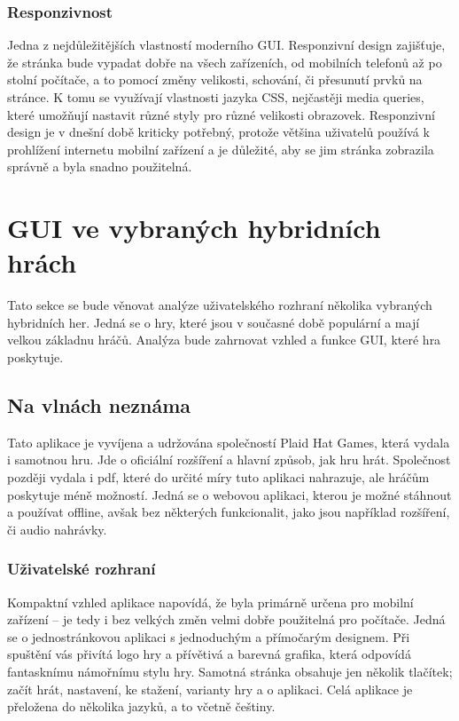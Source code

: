 \subsubsection*{Responzivnost}
Jedna z nejdůležitějších vlastností moderního GUI. Responzivní design zajišťuje, že stránka bude vypadat dobře na všech zařízeních, od mobilních telefonů až po stolní počítače, a to pomocí změny velikosti, schování, či přesunutí prvků na stránce. K tomu se využívají vlastnosti jazyka CSS, nejčastěji media queries, které umožňují nastavit různé styly pro různé velikosti obrazovek. Responzivní design je v dnešní době kriticky potřebný, protože většina uživatelů používá k prohlížení internetu mobilní zařízení a je důležité, aby se jim stránka zobrazila správně a byla snadno použitelná.\cite{responsive_design}

\section{GUI ve vybraných hybridních hrách}
Tato sekce se bude věnovat analýze uživatelského rozhraní několika vybraných hybridních her. Jedná se o hry, které jsou v současné době populární a mají velkou základnu hráčů. Analýza bude zahrnovat vzhled a funkce GUI, které hra poskytuje.

\subsection{Na vlnách neznáma}
Tato aplikace je vyvíjena a udržována společností Plaid Hat Games, která vydala i samotnou hru. Jde o oficiální rozšíření a hlavní způsob, jak hru hrát. Společnost později vydala i pdf, které do určité míry tuto aplikaci nahrazuje, ale hráčům poskytuje méně možností. Jedná se o webovou aplikaci, kterou je možné stáhnout a používat offline, avšak bez některých funkcionalit, jako jsou například rozšíření, či audio nahrávky.

\subsubsection*{Uživatelské rozhraní}
Kompaktní vzhled aplikace napovídá, že byla primárně určena pro mobilní zařízení -- je tedy i bez velkých změn velmi dobře použitelná pro počítače. Jedná se o jednostránkovou aplikaci s jednoduchým a přímočarým designem. Při spuštění vás přivítá logo hry a přívětivá a barevná grafika, která odpovídá fantasknímu námořnímu stylu hry. Samotná stránka obsahuje jen několik tlačítek; začít hrát, nastavení, ke stažení, varianty hry a o aplikaci. Celá aplikace je přeložena do několika jazyků, a to včetně češtiny.

